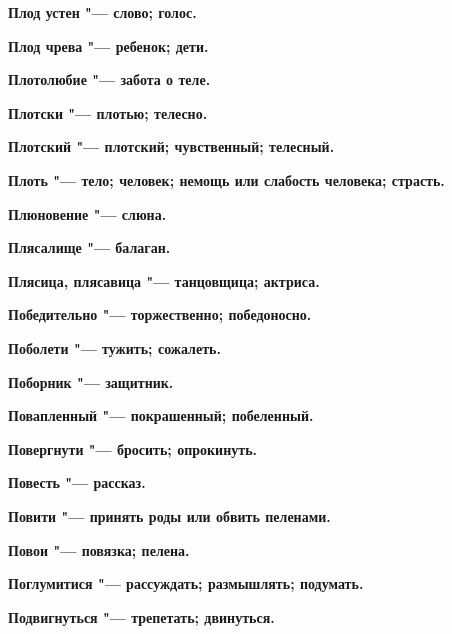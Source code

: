 \begin{mymulticols}{2}
\bfseries Плод устен\normalfont{} "--- слово; голос. 




\bfseries Плод чрева\normalfont{} "--- ребенок; дети. 




\bfseries Плотолюбие\normalfont{} "--- забота о теле. 




\bfseries Плотски\normalfont{} "--- плотью; телесно. 




\bfseries Плотский\normalfont{} "--- плотский; чувственный; телесный. 




\bfseries Плоть\normalfont{} "--- тело; человек; немощь или слабость человека; страсть. 




\bfseries Плюновение\normalfont{} "--- слюна. 




\bfseries Плясалище\normalfont{} "--- балаган. 




\bfseries Плясица, плясавица\normalfont{} "--- танцовщица; актриса. 




\bfseries Победительно\normalfont{} "--- торжественно; победоносно. 




\bfseries Поболети\normalfont{} "--- тужить; сожалеть. 




\bfseries Поборник\normalfont{} "--- защитник. 




\bfseries Повапленный\normalfont{} "--- покрашенный; побеленный. 




\bfseries Повергнути\normalfont{} "--- бросить; опрокинуть. 




\bfseries Повесть\normalfont{} "--- рассказ. 




\bfseries Повити\normalfont{} "--- принять роды или обвить пеленами. 




\bfseries Повои\normalfont{} "--- повязка; пелена. 




\bfseries Поглумитися\normalfont{} "--- рассуждать; размышлять; подумать. 




\bfseries Подвигнуться\normalfont{} "--- трепетать; двинуться. 





\end{mymulticols}
